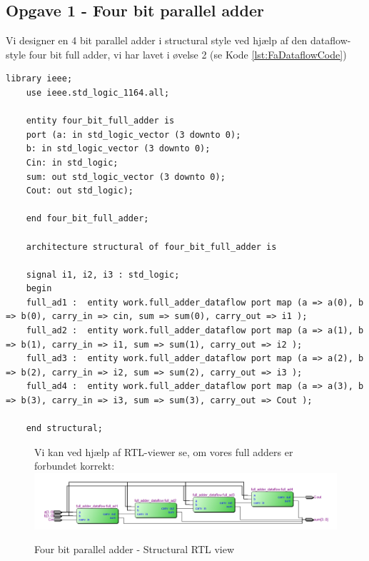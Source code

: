 \subsection{Opgave 1 - Four bit parallel adder}
\begin{enumerate}
	\item[1)]
Vi designer en 4 bit parallel adder i structural style ved hjælp af den dataflow-style four bit full adder, vi har lavet i øvelse 2 (se Kode \ref{lst:FaDataflowCode})


	\medskip
	\begin{lstlisting}[caption={Four bit parallel adder Structural VHDL kode},label={lst:4bitFaStructuralCode}]
	library ieee;
	use ieee.std_logic_1164.all;
	
	entity four_bit_full_adder is
	port (a: in std_logic_vector (3 downto 0);
	b: in std_logic_vector (3 downto 0);
	Cin: in std_logic;
	sum: out std_logic_vector (3 downto 0);
	Cout: out std_logic);
	
	end four_bit_full_adder;
	
	architecture structural of four_bit_full_adder is
	
	signal i1, i2, i3 : std_logic;
	begin
	full_ad1 : 	entity work.full_adder_dataflow port map (a => a(0), b => b(0), carry_in => cin, sum => sum(0), carry_out => i1 );
	full_ad2 : 	entity work.full_adder_dataflow port map (a => a(1), b => b(1), carry_in => i1, sum => sum(1), carry_out => i2 );
	full_ad3 : 	entity work.full_adder_dataflow port map (a => a(2), b => b(2), carry_in => i2, sum => sum(2), carry_out => i3 );
	full_ad4 : 	entity work.full_adder_dataflow port map (a => a(3), b => b(3), carry_in => i3, sum => sum(3), carry_out => Cout );
	
	end structural;
	\end{lstlisting}
	
\begin{figure}[H]
	\item[2)]
	Vi kan ved hjælp af RTL-viewer se, om vores full adders er forbundet korrekt:
	\centering
\includegraphics[scale=0.6]{pictures/Oevelse2/four_bit_full_adder_RTLview.jpeg}
\caption{Four bit parallel adder - Structural RTL view}
\label{fig:4bitFaBehavioralRTL}
\end{figure}


\end{enumerate}
